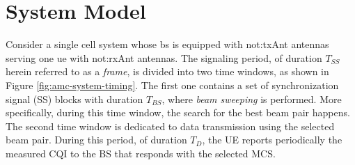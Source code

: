 
\section{System Model}
\label{sec:amc-system-model}

Consider a single cell system whose \gls{bs} is equipped with \gls{not:txAnt} antennas serving one \gls{ue} with \gls{not:rxAnt} antennas. The signaling period, of duration $T_{SS}$ herein referred to as a \emph{frame}, is divided into two time windows, as shown in Figure \ref{fig:amc-system-timing}. The first one contains a set of synchronization signal (SS) blocks with duration $T_{BS}$, where \emph{beam sweeping} is performed. More specifically, during this time window, the search for the best beam pair happens. The second time window is dedicated to data transmission using the selected beam pair. During this period, of duration $T_{D}$, the UE reports periodically the measured CQI to the BS that responds with the selected MCS.
%
%

